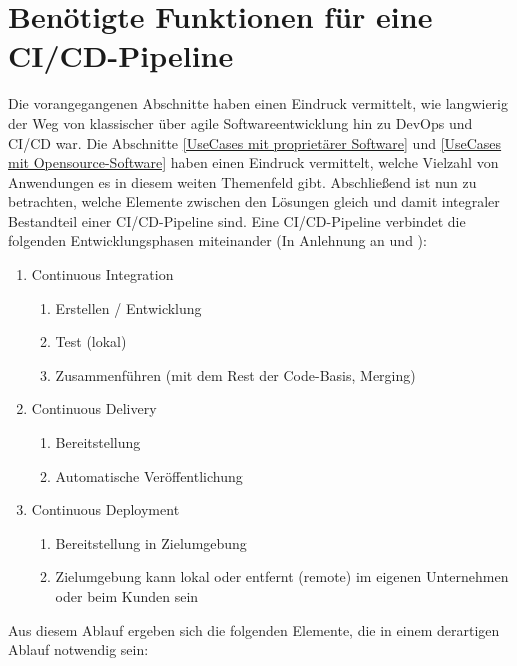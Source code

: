 \section{Benötigte Funktionen für eine CI/CD-Pipeline}
\label{Benoetigte Funktionen für eine CI/CD-Pipeline}
Die vorangegangenen Abschnitte haben einen Eindruck vermittelt, wie langwierig der Weg von klassischer über agile Softwareentwicklung hin zu \gls{DevOps} und \acrshort{CI}/\acrshort{CD} war. Die Abschnitte \ref{UseCases mit proprietärer Software}  und \ref{UseCases mit Opensource-Software} haben einen Eindruck vermittelt, welche Vielzahl von Anwendungen es in diesem weiten Themenfeld gibt. Abschließend ist nun zu betrachten, welche Elemente zwischen den Lösungen gleich und damit integraler Bestandteil einer \acrshort{CI}/\acrshort{CD}-Pipeline sind.\newline
Eine \acrshort{CI}/\acrshort{CD}-Pipeline \glqq{}verbindet\grqq{} die folgenden Entwicklungsphasen miteinander (In Anlehnung an \cite{redhat_cicd_pipline} und \cite{meyer_continuous_2014}):
\begin{enumerate}
    \item Continuous Integration
    \begin{enumerate}
        \item Erstellen / Entwicklung
        \item Test (lokal)
        \item Zusammenführen (mit dem Rest der Code-Basis, \glqq{}Merging\grqq{})
    \end{enumerate}
    \item Continuous Delivery
        \begin{enumerate}
        \item Bereitstellung
        \item Automatische Veröffentlichung 
    \end{enumerate}
    \item Continuous Deployment
        \begin{enumerate}
        \item Bereitstellung in Zielumgebung
        \item Zielumgebung kann lokal oder entfernt (remote) im eigenen Unternehmen oder beim Kunden sein
    \end{enumerate}
\end{enumerate}
Aus diesem Ablauf ergeben sich die folgenden Elemente, die in einem derartigen Ablauf notwendig sein:
